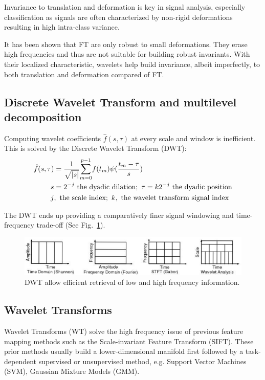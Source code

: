 \documentclass[runningheads]{llncs}
\begin{document}
Invariance to translation and deformation is key in signal analysis, especially classification as signals are often characterized by non-rigid deformations resulting in high intra-class variance\cite{bajcsy}\cite{keysers}\cite{trouve}.

It has been shown that FT are only robust to small deformations\cite{bruna2012invariant}. They erase high frequencies and thus are not suitable for building robust invariants. With their localized characteristic, wavelets help build invariance, albeit imperfectly, to both translation and deformation compared of FT\cite{bruna2012invariant}\cite{mallatlecture}.

\subsection{Discrete Wavelet Transform and multilevel decomposition}

Computing wavelet coefficients $\hat{f}(s,\tau)$ at every scale and window is inefficient. This is solved by the Discrete Wavelet Transform (DWT):
\begin{align}
    \hat{f}(s, \tau)&=\frac{1}{\sqrt{|s|}}\underset{m=0}{\overset{p-1}{\sum}}f(t_m)\psi(\frac{t_m-\tau}{s})\\
    s&=2^{-j}\,\,\text{the dyadic dilation}\notag;\,\,\tau=k2^{-j}\,\,\text{the dyadic position}\notag\\
    j&,\,\,\text{the scale index};\,\,k,\,\,\text{the wavelet transform signal index}\notag
\end{align}

The DWT ends up providing a comparatively finer signal windowing and time-frequency trade-off (See Fig.~\ref{fig1}).
\begin{figure}
\centering\includegraphics[width=\textwidth]{dwt.png}
\caption{DWT allow efficient retrieval of low and high frequency information\cite{dwt}.} \label{fig1}
\end{figure}

\subsection{Wavelet Transforms}

Wavelet Transforms (WT) solve the high frequency issue of previous feature mapping methods such as the Scale-invariant Feature Transform (SIFT)\cite{bruna2012invariant}. These prior methods usually build a lower-dimensional manifold first followed by a task-dependent supervised or unsupervised method, e.g. Support Vector Machines (SVM), Gaussian Mixture Models (GMM)\cite{sanchez1}\cite{sanchez2}.
\end{document}
